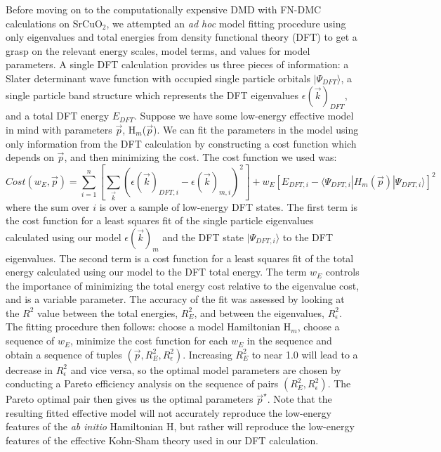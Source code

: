 \documentclass{article}
\begin{document}
Before moving on to the computationally expensive DMD with FN-DMC calculations on SrCuO$_2$, we attempted an \textit{ad hoc} model fitting procedure using only eigenvalues and total energies from density functional theory (DFT) to get a grasp on the relevant energy scales, model terms, and values for model parameters. 
A single DFT calculation provides us three pieces of information: a Slater determinant wave function with occupied single particle orbitals $|\Psi_{DFT}\rangle$, a single particle band structure which represents the DFT eigenvalues $\epsilon(\vec{k})_{DFT}$, and a total DFT energy $E_{DFT}$. 
Suppose we have some low-energy effective model in mind with parameters $\vec{p}$, H$_m$($\vec{p}$).
We can fit the parameters in the model using only information from the DFT calculation by constructing a cost function which depends on $\vec{p}$, and then minimizing the cost. 
The cost function we used was:
\begin{equation}
Cost(w_E, \vec{p}) = \sum_{i=1}^{n} [\sum_{\vec{k}}(\epsilon(\vec{k})_{DFT,i} - \epsilon(\vec{k})_{m,i})^2] + w_E[E_{DFT,i} - \langle \Psi_{DFT,i}|H_m(\vec{p})| \Psi_{DFT,i} \rangle]^2
\end{equation}
where the sum over $i$ is over a sample of low-energy DFT states. The first term is the cost function for a least squares fit of the single particle eigenvalues calculated using our model $\epsilon(\vec{k})_m$ and the DFT state $|\Psi_{DFT,i}\rangle$ to the DFT eigenvalues. 
The second term is a cost function for a least squares fit of the total energy calculated using our model to the DFT total energy. 
The term $w_E$ controls the importance of minimizing the total energy cost relative to the eigenvalue cost, and is a variable parameter. 
The accuracy of the fit was assessed by looking at the $R^2$ value between the total energies, $R^2_E$, and between the eigenvalues, $R^2_\epsilon$. 
The fitting procedure then follows: choose a model Hamiltonian H$_m$, choose a sequence of $w_E$, minimize the cost function for each $w_E$ in the sequence and obtain a sequence of tuples $(\vec{p}, R^2_E, R^2_\epsilon)$. 
Increasing $R^2_E$ to near 1.0 will lead to a decrease in $R^2_\epsilon$ and vice versa, so the optimal model parameters are chosen by conducting a Pareto efficiency analysis on the sequence of pairs $(R^2_E, R^2_\epsilon)$. 
The Pareto optimal pair then gives us the optimal parameters $\vec{p}^\star$. 
Note that the resulting fitted effective model will not accurately reproduce the low-energy features of the \textit{ab initio} Hamiltonian H, but rather will reproduce the low-energy features of the effective Kohn-Sham theory used in our DFT calculation.
\end{document}
